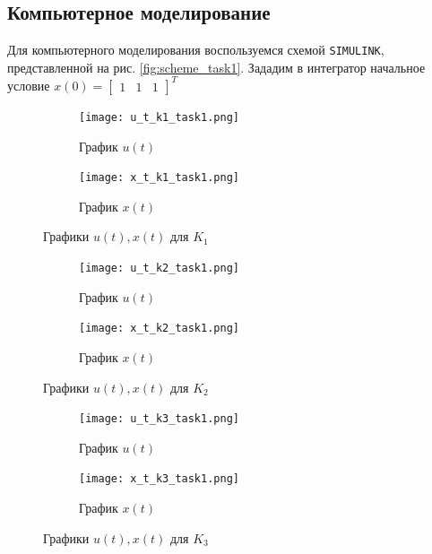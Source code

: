\documentclass[a4paper, 12pt]{article}
\begin{document}
    \subsection{Компьютерное моделирование}
    Для компьютерного моделирования воспользуемся схемой \texttt{SIMULINK},
    представленной на рис. \ref{fig:scheme_task1}.
    Зададим в интегратор начальное условие $x(0)=\begin{bmatrix}
        1 &1 &1
    \end{bmatrix}^T$
    \begin{figure}[H]
        \centering
        \begin{subfigure}{0.45\textwidth}
            \centering
            \texttt{[image: u\_t\_k1\_task1.png]}
            \caption{График $u(t)$}
            \label{fig:task_1_u_t_k1}
        \end{subfigure}
        \hfill
        \begin{subfigure}{0.45\textwidth}
            \centering
            \texttt{[image: x\_t\_k1\_task1.png]}
            \caption{График $x(t)$}
            \label{fig:task_1_x_t_k1}
        \end{subfigure}
        \caption{Графики $u(t),x(t)$ для $K_1$}
        \label{fig:task_1_modeling_1}
    \end{figure}
    \begin{figure}[H]
        \centering
        \begin{subfigure}{0.45\textwidth}
            \centering
            \texttt{[image: u\_t\_k2\_task1.png]}
            \caption{График $u(t)$}
            \label{fig:task_1_u_t_k2}
        \end{subfigure}
        \hfill
        \begin{subfigure}{0.45\textwidth}
            \centering
            \texttt{[image: x\_t\_k2\_task1.png]}
            \caption{График $x(t)$}
            \label{fig:task_1_x_t_k2}
        \end{subfigure}
        \caption{Графики $u(t),x(t)$ для $K_2$}
        \label{fig:task_1_modeling_2}
    \end{figure}
    \begin{figure}[H]
        \centering
        \begin{subfigure}{0.45\textwidth}
            \centering
            \texttt{[image: u\_t\_k3\_task1.png]}
            \caption{График $u(t)$}
            \label{fig:task_1_u_t_k3}
        \end{subfigure}
        \hfill
        \begin{subfigure}{0.45\textwidth}
            \centering
            \texttt{[image: x\_t\_k3\_task1.png]}
            \caption{График $x(t)$}
            \label{fig:task_1_x_t_k3}
        \end{subfigure}
        \caption{Графики $u(t),x(t)$ для $K_3$}
        \label{fig:task_1_modeling_3}
    \end{figure}
\end{document}
